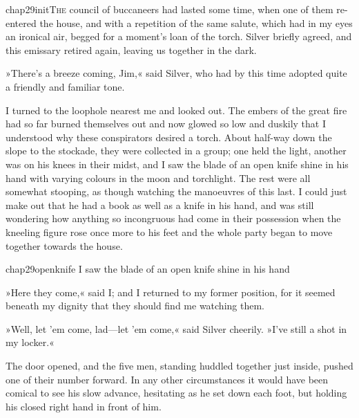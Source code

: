 
\lettrine[lines=5,image=true,findent=2pt]{chap29initT}{he} council of buccaneers had lasted some time, when one of them re-entered the house, and with a repetition of the same salute, which had in my eyes an ironical air, begged for a moment's loan of the torch. Silver briefly agreed, and this emissary retired again, leaving us together in the dark.

»There's a breeze coming, Jim,« said Silver, who had by this time adopted quite a friendly and familiar tone.

I turned to the loophole nearest me and looked out. The embers of the great fire had so far burned themselves out and now glowed so low and duskily that I understood why these conspirators desired a torch. About half-way down the slope to the stockade, they were collected in a group; one held the light, another was on his knees in their midst, and I saw the blade of an open knife shine in his hand with varying colours in the moon and torchlight. The rest were all somewhat stooping, as though watching the manoeuvres of this last. I could just make out that he had a book as well as a knife in his hand, and was still wondering how anything so incongruous had come in their possession when the kneeling figure rose once more to his feet and the whole party began to move together towards the house.


\begin{bwbigpic}
	[\picsize]
	{chap29openknife}
	{I saw the blade of an open knife shine in his hand}
\end{bwbigpic}

»Here they come,« said I; and I returned to my former position, for it seemed beneath my dignity that they should find me watching them.

»Well, let 'em come, lad—let 'em come,« said Silver cheerily. »I've still a shot in my locker.«

The door opened, and the five men, standing huddled together just inside, pushed one of their number forward. In any other circumstances it would have been comical to see his slow advance, hesitating as he set down each foot, but holding his closed right hand in front of him.

